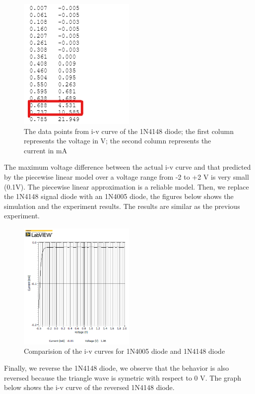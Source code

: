 \documentclass[letterpaper, 10 pt, conference]{ieeeconf}  %
\begin{document}
	\begin{figure}[h]
        \centering
        \includegraphics[width=0.5\textwidth]{images/result4.png}
        \caption{The data points from i-v curve of the 1N4148 diode; the first column represents the voltage in V; the second column represents the current in mA}
    \end{figure}
	The maximum voltage difference between the actual i-v curve and that predicted by the piecewise linear model over a voltage range from -2 to +2 V is very small (0.1V). The piecewise linear approximation is a reliable model.\newline
	Then, we replace the 1N4148 signal diode with an 1N4005 diode, the figures below shows the simulation and the experiment results. The results are similar as the previous experiment. \newline
	\begin{figure}[h]
        \centering
        \includegraphics[width=0.5\textwidth]{images/result6.png}
        \caption{Comparision of the i-v curves for 1N4005 diode and 1N4148 diode}
    \end{figure}
	Finally, we reverse the 1N4148 diode, we observe that the behavior is also reversed because the triangle wave is symetric with respect to 0 V. The graph below shows the i-v curve of the reversed 1N4148 diode.\newline
\end{document}
